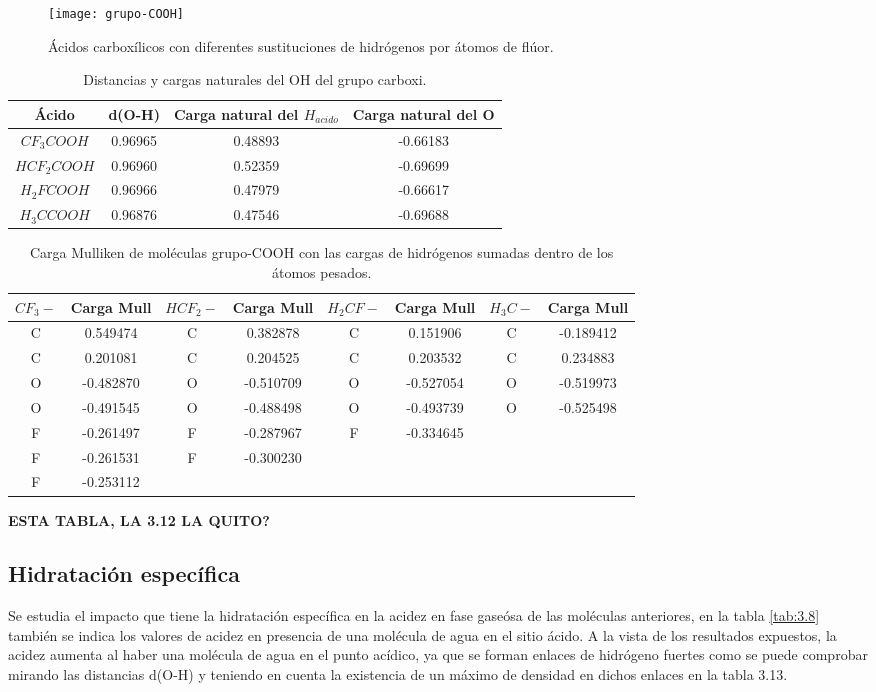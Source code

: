\begin{figure}[H]
	\centering
	\texttt{[image: grupo-COOH]}
	\caption{Ácidos carboxílicos con diferentes sustituciones de hidrógenos por átomos de flúor.}
\end{figure}
\begin{table}[H]
	\centering
	\begin{tabular}{|c|c|c|c|}
		\hline
		Ácido & d(O-H) & Carga natural del $H_{acido}$ & Carga natural del O\\ \hline
		$CF_3COOH$ & 0.96965 & 0.48893 & -0.66183 \\ \hline
		$HCF_2COOH$ & 0.96960 & 0.52359 & -0.69699 \\ \hline
		$H_2FCOOH$ & 0.96966 & 0.47979 & -0.66617 \\ \hline
		$H_3CCOOH$ & 0.96876 & 0.47546 & -0.69688 \\ \hline
	\end{tabular}
	\caption{Distancias y cargas naturales del OH del grupo carboxi.}
\end{table}
\begin{table}[H]
    \centering
    \begin{tabular}{|c|c|c|c|c|c|c|c|}
    \hline
    $CF_3-$ & Carga Mull & $HCF_2-$ & Carga Mull & $H_2CF-$ & Carga Mull & $H_3C-$ & Carga Mull \\ \hline
     C & 0.549474 &  C & 0.382878 & C & 0.151906 & C & -0.189412 \\ \hline
     C & 0.201081 &  C & 0.204525 & C & 0.203532 & C & 0.234883 \\ \hline
     O & -0.482870 & O & -0.510709 & O & -0.527054 & O & -0.519973 \\ \hline
     O & -0.491545 & O & -0.488498 &  O & -0.493739 & O & -0.525498 \\ \hline
     F & -0.261497 & F & -0.287967 & F & -0.334645 &  & \\ \hline
     F & -0.261531 & F & -0.300230 &  &  &  & \\ \hline
     F & -0.253112 &  &  &  &  &  & \\ \hline
    \end{tabular}
    \caption{Carga Mulliken de moléculas grupo-COOH con las cargas de hidrógenos sumadas dentro de los átomos pesados.}
\end{table}

{\bfseries ESTA TABLA, LA 3.12 LA QUITO?}

\subsection{Hidratación específica}
Se estudia el impacto que tiene la hidratación específica en la acidez en fase gaseósa de las moléculas anteriores, en la tabla \ref{tab:3.8} también se indica los valores de acidez en presencia de una molécula de agua en el sitio ácido.
A la vista de los resultados expuestos, la acidez aumenta al haber una molécula de agua en el punto acídico, ya que se forman enlaces de hidrógeno fuertes como se puede comprobar mirando las distancias d(O-H) y teniendo en cuenta la existencia de un máximo de densidad en dichos enlaces en la tabla 3.13. 

